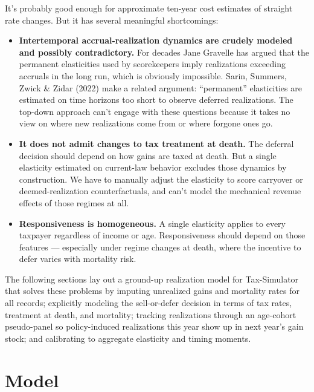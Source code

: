 \documentclass[11pt]{article}
\begin{document}
It's probably good enough for approximate ten-year cost estimates of
straight rate changes. But it has several meaningful shortcomings:

\begin{itemize}
    \item \textbf{Intertemporal accrual-realization dynamics are crudely
          modeled and possibly contradictory.} For decades Jane Gravelle
          has argued that the permanent elasticities used by scorekeepers
          imply realizations exceeding accruals in the long run, which
          is obviously impossible. Sarin, Summers, Zwick \& Zidar (2022)
          make a related argument: ``permanent'' elasticities are
          estimated on time horizons too short to observe deferred
          realizations. The top-down approach can't engage with these
          questions because it takes no view on where new realizations
          come from or where forgone ones go.
    \item \textbf{It does not admit changes to tax treatment at death.}
          The deferral decision should depend on how gains are taxed at
          death. But a single elasticity estimated on current-law
          behavior excludes those dynamics by construction. We have to
          manually adjust the elasticity to score carryover or
          deemed-realization counterfactuals, and can't model the
          mechanical revenue effects of those regimes at all.
    \item \textbf{Responsiveness is homogeneous.} A single elasticity
          applies to every taxpayer regardless of income or age.
          Responsiveness should depend on those features --- especially
          under regime changes at death, where the incentive to defer
          varies with mortality risk.
\end{itemize}

The following sections lay out a ground-up realization model for
Tax-Simulator that solves these problems by imputing unrealized gains
and mortality rates for all records; explicitly modeling the
sell-or-defer decision in terms of tax rates, treatment at death, and
mortality; tracking realizations through an age-cohort pseudo-panel so
policy-induced realizations this year show up in next year's gain stock;
and calibrating to aggregate elasticity and timing moments.

\section{Model}
\label{sec:model}
\end{document}
